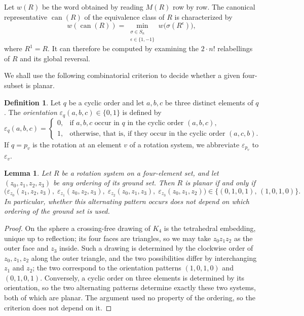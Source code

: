 \documentclass{article}
\theoremstyle{plain}
\newtheorem{lemma}[theorem]{Lemma}
\theoremstyle{definition}
\newtheorem{definition}[theorem]{Definition}
\theoremstyle{remark}
\begin{document}
Let \(w(R)\) be the word obtained by reading \(M(R)\) row by row.  The
canonical representative \(\operatorname{can}(R)\) of the equivalence
class of \(R\) is characterized by
\[
w(\operatorname{can}(R))
=\min_{\substack{\sigma\in S_n\\ \epsilon\in\{1,-1\}}}
  w\bigl(\sigma(R^\epsilon)\bigr),
\]
where \(R^1=R\).  It can therefore be computed by examining
the \(2\cdot n!\) relabellings of \(R\) and its global reversal.

We shall use the following combinatorial criterion to decide whether a
given four-subset is planar.

\begin{definition}\label{def:orientation}
Let \(q\) be a cyclic order and let \(a,b,c\) be three distinct
elements of \(q\).  The \emph{orientation}
\(\varepsilon_q(a,b,c)\in\{0,1\}\) is defined by
\[
\varepsilon_q(a,b,c)=
\begin{cases}
0,&\text{if \(a,b,c\) occur in \(q\) in the cyclic order \((a,b,c)\)},\\
1,&\text{otherwise, that is, if they occur in the cyclic order \((a,c,b)\)}.
\end{cases}
\]
If \(q=p_v\) is the rotation at an element \(v\) of a rotation system,
we abbreviate \(\varepsilon_{p_v}\) to \(\varepsilon_v\).
\end{definition}

\begin{lemma}\label{planar}
Let \(R\) be a rotation system on a four-element set, and let
\((z_0,z_1,z_2,z_3)\) be any ordering of its ground set.  Then \(R\) is
planar if and only if
\begin{equation}\label{eq:planar-orientations}
\bigl(\varepsilon_{z_0}(z_1,z_2,z_3),\;
      \varepsilon_{z_1}(z_0,z_2,z_3),\;
      \varepsilon_{z_2}(z_0,z_1,z_3),\;
      \varepsilon_{z_3}(z_0,z_1,z_2)\bigr)
\in\bigl\{(0,1,0,1),\,(1,0,1,0)\bigr\}.
\end{equation}
In particular, whether this alternating pattern occurs does not depend
on which ordering of the ground set is used.
\end{lemma}

\begin{proof}
On the sphere a crossing-free drawing of \(K_4\) is the tetrahedral
embedding, unique up to reflection; its four faces are triangles, so we
may take \(z_0z_1z_2\) as the outer face and \(z_3\) inside.  Such a
drawing is determined by the clockwise order of \(z_0,z_1,z_2\) along
the outer triangle, and the two possibilities differ by interchanging
\(z_1\) and \(z_2\); the two correspond to the orientation patterns
\((1,0,1,0)\) and \((0,1,0,1)\).  Conversely, a cyclic order on three
elements is determined by its orientation, so the two alternating
patterns determine exactly these two systems, both of which are
planar.  The argument used no property of the ordering, so the
criterion does not depend on it.
\end{proof}
\end{document}
